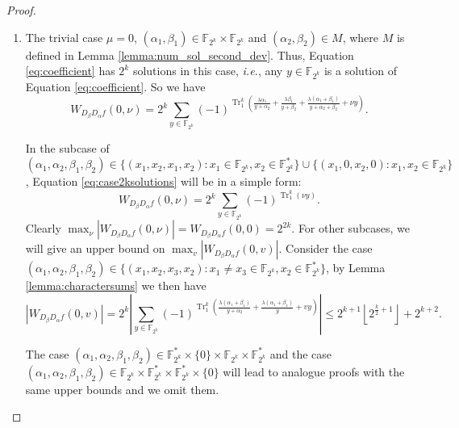 \documentclass[preprint,10pt]{elsarticle}
\newcommand{\F}{\mathbb{F}}
\newcommand{\0}{\textbf{0}}
\newcommand{\1}{\textbf{1}}
\newcommand{\TRACE}{\operatorname{Tr}_1^k}
\theoremstyle{plain}
\begin{document}
\begin{proof}
        \begin{enumerate}[label=\textbf{Case \arabic*},wide = 0pt]
            \item The trivial case $\mu=0$, $(\alpha_1,\beta_1)\in\F_{2^k}\times\F_{2^k}$ and $(\alpha_2,\beta_2)\in M$, where $M$ is defined in Lemma \ref{lemma:num_sol_second_dev}.
            Thus, Equation \eqref{eq:coefficient} has $2^k$ solutions in this case, \emph{i.e.}, any $y\in\F_{2^k}$ is a solution of Equation \eqref{eq:coefficient}.
            So we have
            \begin{equation}\label{eq:case2ksolutions}
                W_{D_{\beta}D_{\alpha}f}(0,\nu)=2^k\sum_{y\in\F_{2^k}}(-1)^{\TRACE\left(\frac{\lambda\alpha_1}{y+\alpha_2}+\frac{\lambda\beta_1}{y+\beta_2}+\frac{\lambda(\alpha_1+\beta_1)}{y+\alpha_2+\beta_2}+\nu y\right)}.
            \end{equation}

            In the subcase of
            $(\alpha_1,\alpha_2,\beta_1,\beta_2)\in\{(x_1,x_2,x_1,x_2):x_1\in\F_{2^k},x_2\in\F_{2^k}^*\}\cup\{(x_1,0,x_2,0):x_1,x_2\in\F_{2^k}\}$,
            Equation \eqref{eq:case2ksolutions} will be in a simple form:
            \[W_{D_{\beta}D_{\alpha}f}(0,\nu)=2^k\sum_{y\in\F_{2^k}}(-1)^{\TRACE\left(\nu y\right)}.\]
            Clearly $\max_{\nu}|W_{D_{\beta}D_{\alpha}f}(0,\nu)|=W_{D_{\beta}D_{\alpha}f}(0,0)=2^{2k}$.
            For other subcases, we will give an upper bound on $\max_{v}|W_{D_{\beta}D_{\alpha}f}(0,v)|$.
            Consider the case $(\alpha_1,\alpha_2,\beta_1,\beta_2)\in\{(x_1,x_2,x_3,x_2):x_1\ne x_3\in\F_{2^k},x_2\in\F_{2^k}^*\}$,
            by Lemma \ref{lemma:charactersums} we then have
            \[\left\lvert W_{D_{\beta}D_{\alpha}f}(0,v)\right\rvert =2^k\left\lvert \sum_{y\in\F_{2^k}}(-1)^{\TRACE\left(\frac{\lambda(\alpha_1+\beta_1)}{y+\alpha_2}+\frac{\lambda(\alpha_1+\beta_1)}{y}+vy\right)}\right\rvert\le 2^{k+1}\left\lfloor 2^{\frac{k}{2}+1}\right\rfloor+2^{k+2}.\]

            The case $(\alpha_1,\alpha_2,\beta_1,\beta_2)\in\F_{2^k}^*\times\{0\}\times\F_{2^k}\times\F_{2^k}^*$ and the case $(\alpha_1,\alpha_2,\beta_1,\beta_2)\in\F_{2^k}\times\F_{2^k}^*\times\F_{2^k}^*\times\{0\}$ will lead to analogue proofs with the same upper bounds and we omit them.


\end{enumerate}
\end{proof}
\end{document}

